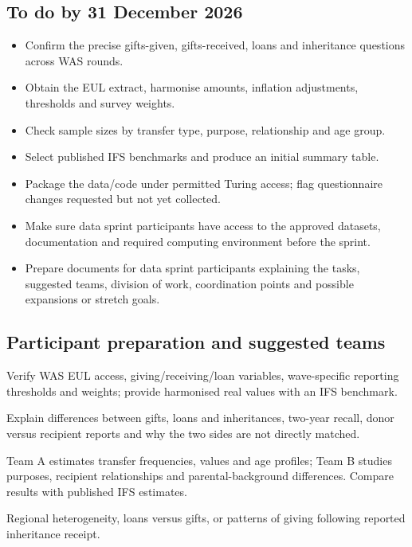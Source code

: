 \subsection{To do by 31 December 2026}
\begin{itemize}[nosep]
\item Confirm the precise gifts-given, gifts-received, loans and inheritance questions across WAS rounds.
\item Obtain the EUL extract, harmonise amounts, inflation adjustments, thresholds and survey weights.
\item Check sample sizes by transfer type, purpose, relationship and age group.
\item Select published IFS benchmarks and produce an initial summary table.
\item Package the data/code under permitted Turing access; flag questionnaire changes requested but not yet collected.
\item Make sure data sprint participants have access to the approved datasets, documentation and required computing environment before the sprint.
\item Prepare documents for data sprint participants explaining the tasks, suggested teams, division of work, coordination points and possible expansions or stretch goals.
\end{itemize}

\subsection{Participant preparation and suggested teams}
\begin{description}[style=nextline]
\item[Access preflight] Verify WAS EUL access, giving/receiving/loan variables, wave-specific reporting thresholds and weights; provide harmonised real values with an IFS benchmark.
\item[Participant brief] Explain differences between gifts, loans and inheritances, two-year recall, donor versus recipient reports and why the two sides are not directly matched.
\item[Suggested teams] Team A estimates transfer frequencies, values and age profiles; Team B studies purposes, recipient relationships and parental-background differences. Compare results with published IFS estimates.
\item[Stretch goals] Regional heterogeneity, loans versus gifts, or patterns of giving following reported inheritance receipt.
\end{description}

